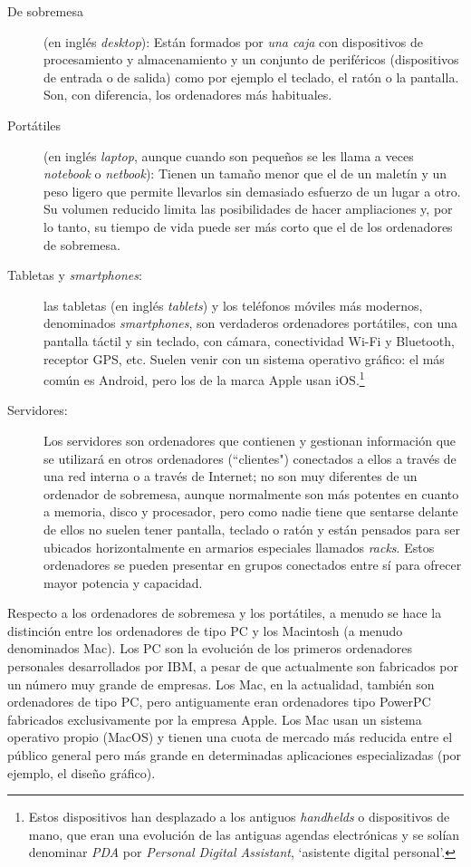 \begin{description} \item[De sobremesa] (en inglés \emph{desktop}): Están formados por \emph{una caja} con dispositivos de procesamiento y almacenamiento y un conjunto de periféricos (dispositivos de entrada o de salida) como por ejemplo el teclado, el ratón o la pantalla. Son, con diferencia, los ordenadores más habituales. \item[Portátiles] (en inglés \emph{laptop}, aunque cuando son pequeños se les llama a veces \emph{notebook} o \emph{netbook}): Tienen un tamaño menor que el de un maletín y un peso ligero que permite llevarlos sin demasiado esfuerzo de un lugar a otro. Su volumen reducido limita las posibilidades de hacer ampliaciones y, por lo tanto, su tiempo de vida puede ser más corto que el de los ordenadores de sobremesa. 

\item[Tabletas y \emph{smartphones}:] las tabletas (en inglés \emph{tablets}) y los teléfonos móviles más modernos, denominados \emph{smartphones}, son verdaderos ordenadores portátiles, con una pantalla táctil y sin teclado, con cámara, conectividad Wi-Fi y Bluetooth, receptor GPS, etc. Suelen venir con un sistema operativo gráfico: el más común es Android, pero los de la marca Apple usan iOS.\footnote{Estos dispositivos han desplazado a los antiguos \emph{handhelds} o dispositivos de mano, que eran una evolución de las antiguas agendas electrónicas y se solían denominar \emph{PDA} por \emph{Personal Digital Assistant}, `asistente digital personal'.} 

\item[Servidores:] Los servidores son ordenadores que contienen y gestionan información que se utilizará en otros ordenadores (``clientes") conectados a ellos a través de una red interna o a través de Internet; no son muy diferentes de un ordenador de sobremesa, aunque normalmente son más potentes en cuanto a memoria, disco y procesador, pero como nadie tiene que sentarse delante de ellos no suelen tener pantalla, teclado o ratón y están pensados para ser ubicados horizontalmente en armarios especiales llamados \emph{racks}. Estos ordenadores se pueden presentar en grupos conectados entre sí para ofrecer mayor potencia y capacidad. \end{description} 

Respecto a los ordenadores de sobremesa y los portátiles, a menudo se hace la distinción entre los ordenadores de tipo PC y los Macintosh (a menudo denominados Mac). Los PC son la evolución de los primeros ordenadores personales desarrollados por IBM, a pesar de que actualmente son fabricados por un número muy grande de empresas. Los Mac, en la actualidad, también son ordenadores de tipo PC, pero antiguamente eran ordenadores tipo PowerPC fabricados exclusivamente por la empresa Apple. Los Mac usan un sistema operativo propio (MacOS) y tienen una cuota de mercado más reducida entre el público general pero más grande en determinadas aplicaciones especializadas (por ejemplo, el diseño gráfico). 

